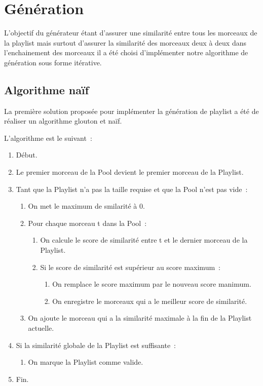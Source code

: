 \section{Génération}
\label{impl:generation}

L'objectif du générateur étant d'assurer une similarité entre tous les
morceaux de la playlist mais surtout d'assurer la similarité des morceaux deux
à deux dans l'enchainement des morceaux il a été choisi d'implémenter notre
algorithme de génération sous forme itérative.

\subsection{Algorithme naïf}
\label{impl:selection:naif}

La première solution proposée pour implémenter la génération de playlist a été
de réaliser un algorithme glouton et naïf.\newline

L'algorithme est le suivant~:

\begin{enumerate}
\item Début.
\item Le premier morceau de la Pool devient le premier morceau de la Playlist.
\item Tant que la Playlist n'a pas la taille requise et que la Pool n'est pas
vide~:
  \begin{enumerate}
    \item On met le maximum de smilarité à 0.
    \item Pour chaque morceau t dans la Pool~:
      \begin{enumerate}
        \item On calcule le score de similarité entre t et le dernier morceau
        de la Playlist.
    \item Si le score de similarité est supérieur au score maximum~:
        \begin{enumerate}
        \item On remplace le score maximum par le nouveau score manimum.
        \item On enregistre le morceaux qui a le meilleur score de similarité.
        \end{enumerate}
        \end{enumerate}
        \item On ajoute le morceau qui a la similarité maximale à la fin de la
        Playlist actuelle.
    \end{enumerate}
    \item Si la similarité globale de la Playlist est suffisante~:
    \begin{enumerate}
    \item On marque la Playlist comme valide.
    \end{enumerate}
    \item Fin.
\end{enumerate}

